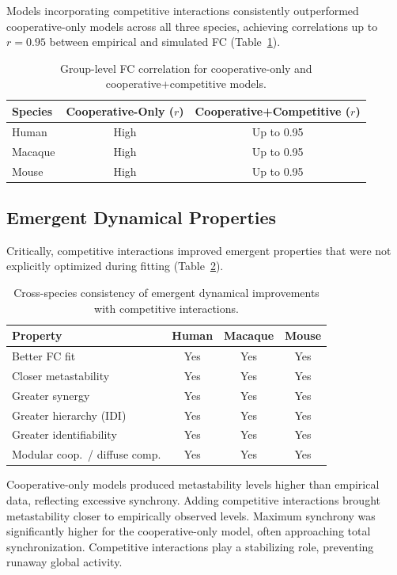 \documentclass[11pt]{article}
\begin{document}
Models incorporating competitive interactions consistently outperformed cooperative-only models across all three species, achieving correlations up to $r = 0.95$ between empirical and simulated FC (Table~\ref{tab:fcfit}).

\begin{table}[ht]
\centering
\caption{Group-level FC correlation for cooperative-only and cooperative+competitive models.}
\label{tab:fcfit}
\begin{tabular}{@{}lcc@{}}
\toprule
Species & Cooperative-Only ($r$) & Cooperative+Competitive ($r$) \\
\midrule
Human & High & Up to 0.95 \\
Macaque & High & Up to 0.95 \\
Mouse & High & Up to 0.95 \\
\bottomrule
\end{tabular}
\end{table}

\subsection{Emergent Dynamical Properties}

Critically, competitive interactions improved emergent properties that were not explicitly optimized during fitting (Table~\ref{tab:emergent}).

\begin{table}[ht]
\centering
\caption{Cross-species consistency of emergent dynamical improvements with competitive interactions.}
\label{tab:emergent}
\begin{tabular}{@{}lccc@{}}
\toprule
Property & Human & Macaque & Mouse \\
\midrule
Better FC fit & Yes & Yes & Yes \\
Closer metastability & Yes & Yes & Yes \\
Greater synergy & Yes & Yes & Yes \\
Greater hierarchy (IDI) & Yes & Yes & Yes \\
Greater identifiability & Yes & Yes & Yes \\
Modular coop.\ / diffuse comp. & Yes & Yes & Yes \\
\bottomrule
\end{tabular}
\end{table}

Cooperative-only models produced metastability levels higher than empirical data, reflecting excessive synchrony.  Adding competitive interactions brought metastability closer to empirically observed levels.  Maximum synchrony was significantly higher for the cooperative-only model, often approaching total synchronization.  Competitive interactions play a stabilizing role, preventing runaway global activity.
\end{document}
